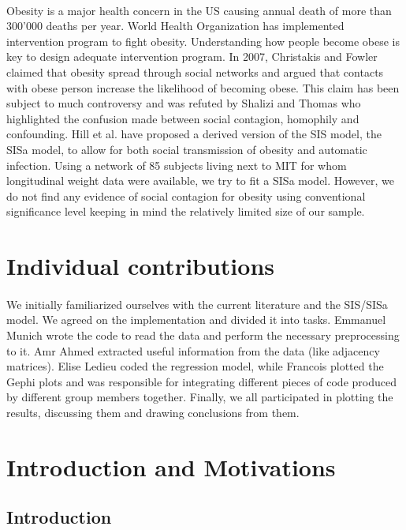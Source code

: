 \documentclass[11pt]{article}
\begin{document}
\paragraph{}
Obesity is a major health concern in the US causing annual death of more than 300'000 deaths per year. World Health Organization has implemented intervention program to fight obesity.  Understanding how people become obese is key to design adequate intervention program. In 2007, Christakis and Fowler claimed that obesity spread through social networks and argued that contacts with obese person increase the likelihood of becoming obese. This claim has been subject to much controversy and was refuted by Shalizi and Thomas who highlighted the confusion made between social contagion, homophily and confounding.  Hill et al. have proposed a derived version of the SIS model, the SISa model, to allow for both social transmission of obesity and automatic infection. Using a network of 85 subjects living next to MIT for whom longitudinal weight data were available, we try to fit a SISa model. However, we do not find any evidence of social contagion for obesity using conventional significance level keeping in mind the relatively limited size of our sample.
\pagebreak

\section{Individual contributions}
\paragraph{}
We initially familiarized ourselves with the current literature and the SIS/SISa model. We agreed on the implementation and divided it into tasks. Emmanuel Munich wrote the code to read the data and perform the necessary preprocessing to it. Amr Ahmed extracted useful information from the data (like adjacency matrices). Elise Ledieu coded the regression model, while Francois plotted the Gephi plots and was responsible for integrating different pieces of code produced by different group members together. Finally, we all participated in plotting the results, discussing them and drawing conclusions from them.
\pagebreak

\section{Introduction and Motivations}

\subsection{Introduction}
\end{document}
